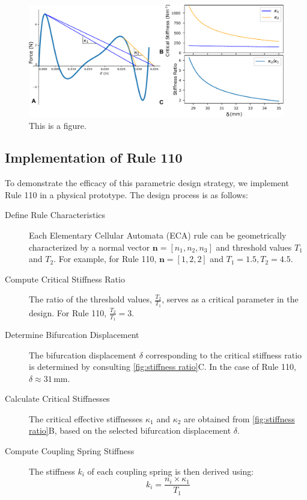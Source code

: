 \begin{figure}[H]
    \centering
    \includegraphics[width=\textwidth]{images/SVGs/stiffness_ratio.pdf}
    \caption{This is a figure.}
    \label{fig:stiffness ratio}
\end{figure}

\subsection*{Implementation of Rule 110}

To demonstrate the efficacy of this parametric design strategy, we implement Rule 110 in a physical prototype. The design process is as follows:

\begin{description}
    \item[Define Rule Characteristics] Each Elementary Cellular Automata (ECA) rule can be geometrically characterized by a normal vector \( \mathbf{n} = [n_1, n_2, n_3] \) and threshold values \( T_1 \) and \( T_2 \). For example, for Rule 110, \( \mathbf{n} = [1, 2, 2] \) and \( T_1 = 1.5, T_2 = 4.5 \).
    
    \item[Compute Critical Stiffness Ratio] The ratio of the threshold values, \( \frac{T_2}{T_1} \), serves as a critical parameter in the design. For Rule 110, \( \frac{T_2}{T_1} = 3 \).
    
    \item[Determine Bifurcation Displacement] The bifurcation displacement \( \delta \) corresponding to the critical stiffness ratio is determined by consulting \autoref*{fig:stiffness ratio}C. In the case of Rule 110, \( \delta \approx 31 \, \text{mm} \).
    
    \item[Calculate Critical Stiffnesses] The critical effective stiffnesses \( \kappa_1 \) and \( \kappa_2 \) are obtained from \autoref*{fig:stiffness ratio}B, based on the selected bifurcation displacement \( \delta \).
    
    \item[Compute Coupling Spring Stiffness] The stiffness \( k_i \) of each coupling spring is then derived using:
    \[
    k_i = \frac{n_i \times \kappa_1}{T_1}
    \]
\end{description}


